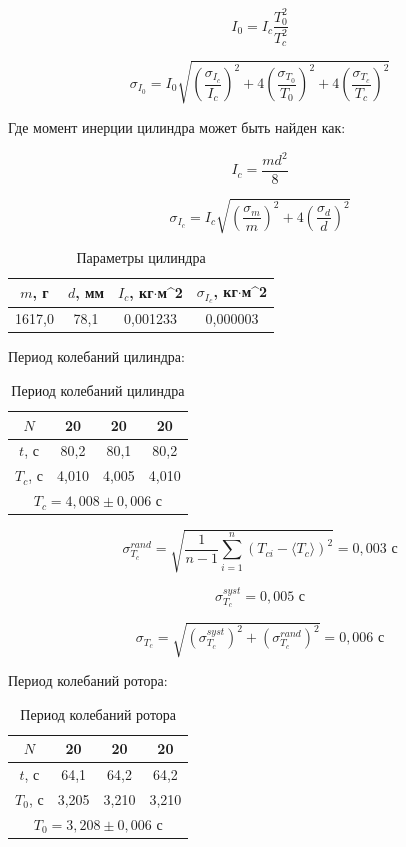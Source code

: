 \documentclass[12pt]{article}
\begin{document}
$$I_0 = I_c\frac{T_0^2}{T_c^2}$$

$$\sigma_{I_0} = I_0\sqrt{(\frac{\sigma_{I_c}}{I_c})^2 + 4(\frac{\sigma_{T_0}}{T_0})^2 + 4(\frac{\sigma_{T_c}}{T_c})^2}$$

Где момент инерции цилиндра может быть найден как:

$$I_c = \frac{md^2}{8}$$

$$\sigma_{I_c} = I_c\sqrt{(\frac{\sigma_m}{m})^2 + 4(\frac{\sigma_d}{d})^2}$$

\begin{table}[h!]
	\begin{center}
		\begin{tabular}{|c|c|c|c|}
			\hline
			 $m$, г& $d$, мм & $I_c$, кг$\cdot$м^2 & $\sigma_{I_c}$, кг$\cdot$м^2 \\ \hline
			 1617,0   & 78,1  &  0,001233 & 0,000003   \\ \hline
		\end{tabular}
		\caption{Параметры цилиндра}
	\end{center}
\end{table}

Период колебаний цилиндра:

\begin{table}[h!]
	\begin{center}
		\begin{tabular}{|c|c|c|c|}
			\hline
			 $N$ & 20 & 20 & 20 \\ \hline
			 $t$, с & 80,2 & 80,1 & 80,2      \\ \hline
              $T_c$, с & 4,010 & 4,005 & 4,010     \\ \hline
              \multicolumn{4}{|c|}{$T_c = 4,008 \pm 0,006 \text{ с}$} \\ \hline
		\end{tabular}
		\caption{Период колебаний цилиндра}
	\end{center}
\end{table}

$$\sigma_{T_c}^{rand} = \sqrt{\frac{1}{n - 1} \sum_{i = 1}^{n} ({T_{ci} - \langle T_c \rangle})^2 } = 0,003 \text{ с}$$

$$\sigma_{T_c}^{syst} = 0,005 \text{ с}$$

$$\sigma_{T_c} = \sqrt{(\sigma_{T_c}^{syst})^2 + (\sigma_{T_c}^{rand})^2 } = 0,006 \text{ с}$$

\newpage

Период колебаний ротора:

\begin{table}[h!]
	\begin{center}
		\begin{tabular}{|c|c|c|c|}
			\hline
			 $N$ & 20 & 20 & 20 \\ \hline
			 $t$, с & 64,1 & 64,2 & 64,2      \\ \hline
              $T_0$, с & 3,205 & 3,210 & 3,210     \\ \hline
            \multicolumn{4}{|c|}{$T_0 = 3,208 \pm 0,006 \text{ с}$} \\ \hline
		\end{tabular}
		\caption{Период колебаний ротора}
	\end{center}
\end{table}
\end{document}
